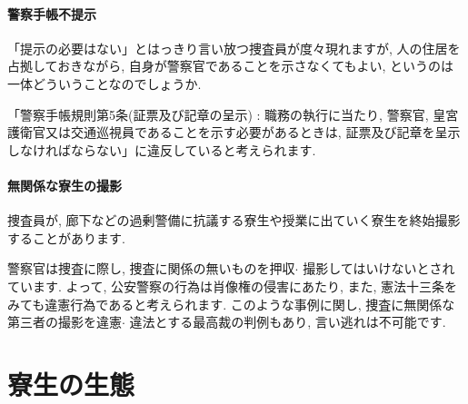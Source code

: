 \documentclass[10pt,b5jsbook,dvips,dvipdfmx,openany]{jsbook}
\theoremstyle{definition}
\begin{document}
			\subsubsection{警察手帳不提示}
			「提示の必要はない」とはっきり言い放つ捜査員が度々現れますが, 人の住居を占拠しておきながら, 自身が警察官であることを示さなくてもよい, というのは一体どういうことなのでしょうか. 

			「警察手帳規則第5条(証票及び記章の呈示) : 職務の執行に当たり, 警察官, 皇宮護衛官又は交通巡視員であることを示す必要があるときは, 証票及び記章を呈示しなければならない」に違反していると考えられます. 

			\subsubsection{無関係な寮生の撮影}
			捜査員が, 廊下などの過剰警備に抗議する寮生や授業に出ていく寮生を終始撮影することがあります. 

			警察官は捜査に際し, 捜査に関係の無いものを押収$ \cdot $ 撮影してはいけないとされています. よって, 公安警察の行為は肖像権の侵害にあたり, また, 憲法十三条をみても違憲行為であると考えられます. このような事例に関し, 捜査に無関係な第三者の撮影を違憲$ \cdot $ 違法とする最高裁の判例もあり, 言い逃れは不可能です. 


\chapter{寮生の生態} %
\end{document}
